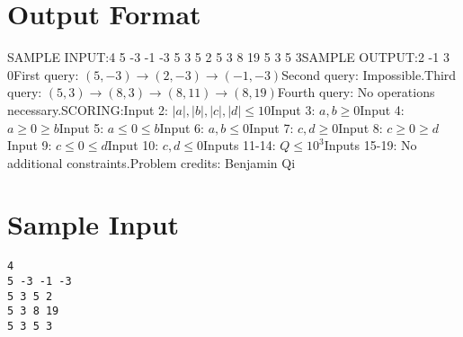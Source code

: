 \documentclass[12pt]{article}
\begin{document}
\section*{Output Format}
SAMPLE INPUT:4
5 -3 -1 -3
5 3 5 2
5 3 8 19
5 3 5 3SAMPLE OUTPUT:2
-1
3
0First query: $(5,-3)\to (2,-3)\to (-1,-3)$Second query: Impossible.Third query: $(5,3) \to (8, 3) \to (8, 11) \to (8, 19)$Fourth query: No operations necessary.SCORING:Input 2: $|a|, |b|, |c|,|d|\le 10$Input 3: $a,b\ge 0$Input 4: $a \geq 0 \geq b$Input 5: $a \leq 0 \leq b$Input 6: $a,b\le 0$Input 7: $c,d\ge 0$Input 8: $c \geq 0 \geq d$Input 9: $c \leq 0 \leq d$Input 10: $c,d\le 0$Inputs 11-14: $Q \leq 10^3$Inputs 15-19: No additional constraints.Problem credits: Benjamin Qi

\section*{Sample Input}
\begin{verbatim}
4
5 -3 -1 -3
5 3 5 2
5 3 8 19
5 3 5 3
\end{verbatim}
\end{document}
